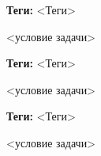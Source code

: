 \documentclass[idxtotoc,hyperref,openany,oneside]{files/reverse} %
\begin{document}



\textbf{Теги:} <Теги>\vspace{\baselineskip}

\begin{tcolorbox}
<условие задачи>
\end{tcolorbox}




\textbf{Теги:} <Теги>\vspace{\baselineskip}

\begin{tcolorbox}
<условие задачи>
\end{tcolorbox}



\textbf{Теги:} <Теги>\vspace{\baselineskip}

\begin{tcolorbox}
<условие задачи>
\end{tcolorbox}

\end{document}

